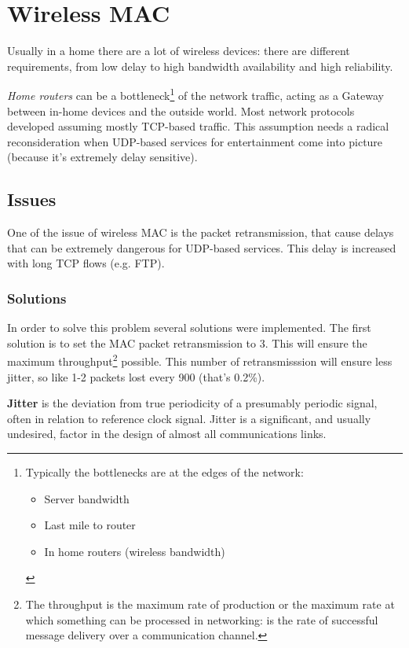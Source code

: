 \chapter{Wireless MAC}


Usually in a home there are a lot of wireless devices: there are different
requirements, from low delay to high bandwidth availability and high
reliability.

\textit{Home routers} can be a bottleneck\footnote{
  Typically the bottlenecks are at the edges of the network:
  \begin{itemize}
  \item Server bandwidth
  \item Last mile to router
  \item In home routers (wireless bandwidth)
  \end{itemize}
}
of the network traffic, acting as a Gateway between in-home devices and the
outside world.
Most network protocols developed assuming mostly TCP-based traffic. This
assumption needs a radical reconsideration when UDP-based services for
entertainment come into picture (because it's extremely delay sensitive).

\section{Issues}

One of the issue of wireless MAC is the packet retransmission, that cause delays
that can be extremely dangerous for UDP-based services. This delay is increased
with long TCP flows (e.g. FTP).

\subsection{Solutions}

In order to solve this problem several solutions were implemented. The first
solution is to set the MAC packet retransmission to 3. This will ensure the
maximum throughput\footnote{
  The throughput is the maximum rate of production or the maximum rate at which
  something can be processed in networking: is the rate of successful message
  delivery over a communication channel.
}
possible. This number of retransmisssion will ensure less jitter, so like 1-2
packets lost every 900 (that's 0.2\%).

\textbf{Jitter} is the deviation from true periodicity of a presumably
periodic signal, often in relation to reference clock signal. Jitter is a
significant, and usually undesired, factor in the design of almost all
communications links.

